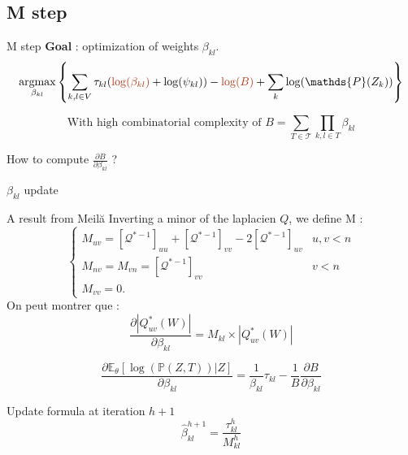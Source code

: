 \documentclass[9pt]{beamer}
\newcommand{\emphase}[1]{\textcolor{Complement}{#1}}
\newcommand{\argmax}{\mathop{\mathrm{argmax}}}
\begin{document}

\subsection{M step}
\begin{frame}{M step}
\textbf{Goal} : optimization of weights $\beta_{kl}$.\\
\vspace{1cm}
\[\argmax_{\beta_{kl}} \left\{\sum_{k,l\in V} \tau_{kl}(\emphase{\log(\beta_{kl})} + \log(\psi_{kl}) ) -\emphase{\log(B)} +\sum_k \log(\mathds{P}(Z_k))\right\}\]

  \vspace{1cm}
  
 \[\text{With high combinatorial complexity of } B = \sum_{T\in\mathcal{T}} \prod_{k,l\in T} \beta_{kl}\]
 
 \begin{center}
     How to compute \Large{$\frac{\partial B}{\partial\beta_{kl}}$ }?
 \end{center}
\end{frame}

 \begin{frame}{$\beta_{kl}$ update}
 \begin{exampleblock}{A result from Meil{\u{a}} \cite{MixtTrees}}
Inverting a minor of the laplacien $Q$, we define M : 
\[\begin{cases}
    M_{uv} = [\mathcal{Q}^{*-1}]_{uu} + [\mathcal{Q}^{*-1}]_{vv} -2[\mathcal{Q}^{*-1}]_{uv} & u,v < n\\
    M_{nv} =M_{vn} =[\mathcal{Q}^{*-1}]_{vv} & v<n\\
     M_{vv} =0.
   \end{cases}\]
On peut montrer que :
\[ \frac{\partial|Q^*_{uv}(W)|}{\partial \beta_{kl}} = M_{kl} \times |Q^*_{uv}(W)|\]
\end{exampleblock}
\[ \frac{\partial\mathds{E}_\theta[\log(\mathds{P}(Z,T))|Z]}{\partial\beta_{kl}} =\frac{1 }{\beta_{kl}} \tau_{kl} - \frac{1}{B}
\frac{\partial B}{\partial\beta_{kl}}
\]


\begin{block}{Update formula at iteration $h+1$}
   \large{\[\hat{\beta}_{kl}^{h+1} = \frac{\tau_{kl}^h}{M_{kl}^h}\]}
   \end{block}
 \end{frame}
\end{document}
